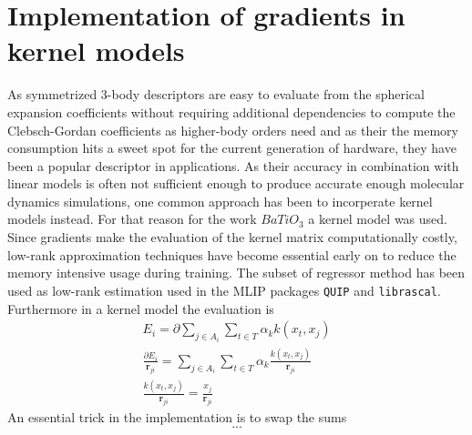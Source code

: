 \section{Implementation of gradients in kernel models}
As symmetrized 3-body descriptors are easy to evaluate from the spherical expansion coefficients without requiring additional dependencies to compute the Clebsch-Gordan coefficients as higher-body orders need and as their the memory consumption hits a sweet spot for the current generation of hardware, they have been a popular descriptor in applications.
As their accuracy in combination with linear models is often not sufficient enough to produce accurate enough molecular dynamics simulations, one common approach has been to incorperate kernel models instead. %
For that reason for the work $BaTiO_3$ a kernel model was used.
Since gradients make the evaluation of the kernel matrix computationally costly, low-rank approximation techniques have become essential early on to reduce the memory intensive usage during training.
The subset of regressor method\cite{TODO} has been used as low-rank estimation used in the MLIP packages \texttt{QUIP} and \texttt{librascal}.
Furthermore in a kernel model the evaluation is
\begin{subequations}
\begin{align}
  E_i = \partial \sum_{j\in A_i} \sum_{t\in T} \alpha_k k(x_t, x_j) \\
  \frac{\partial E_i}{\mathbf{r}_{ji}} = \sum_{j\in A_i} \sum_{t\in T} \alpha_k \frac{k(x_t, x_j)}{\mathbf{r}_{ji}} \\
   \frac{k(x_t, x_j)}{\mathbf{r}_{ji}} = \frac{x_j}{\mathbf{r}_{ji}}
\end{align}
\end{subequations}
An essential trick in the implementation is to swap the sums
\begin{equation}
  ...
\end{equation}

